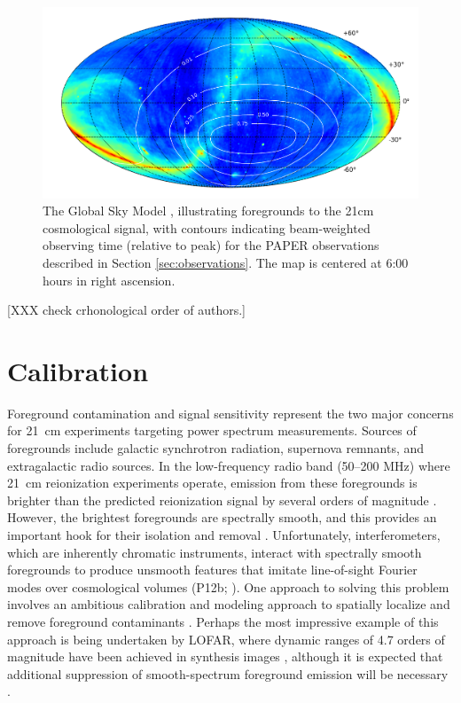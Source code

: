 \documentclass[twocolumn,numberedappendix]{emulateapj} \shorttitle{New Limits on the 21 cm Power Spectrum at $z=8.4$}
\begin{document}
\begin{figure}\centering
\includegraphics[width=2\columnwidth]{plots/coverage.png}
\caption{The Global Sky Model \citep{deoliveira2008}, illustrating foregrounds to the 21cm
cosmological signal, with 
contours indicating beam-weighted observing time (relative to peak) for the PAPER observations
described in Section \ref{sec:observations}.  The map is centered at 6:00 hours in right ascension.
}\label{fig:coverage}
\end{figure}


[XXX check crhonological order of authors.]
\section{Calibration}\label{sec:calib}

Foreground contamination and signal sensitivity represent the two major concerns for 21~cm
experiments targeting power spectrum measurements. Sources of foregrounds include
galactic synchrotron radiation, supernova remnants, and extragalactic radio sources.
In the low-frequency radio band (50--200 MHz) where 21~cm reionization
experiments operate, emission from these foregrounds is brighter than the
predicted reionization signal by several orders of magnitude
\citep{ghosh_et_al2011,bernardi_et_al2010,bernardi_et_al2009,ali_et_al2008,deoliveira2008,jelic_et_al2008,santos_et_al2005}.
However, the brightest foregrounds are spectrally smooth, and this provides an
important hook for their isolation and removal
\citep{liu_tegmark2012,petrovic_oh2011,liu_et_al2009}.  Unfortunately,
interferometers, which are inherently chromatic
instruments, interact with spectrally smooth foregrounds to produce unsmooth features that
imitate line-of-sight Fourier modes over cosmological volumes (P12b; \citealt{bowman_et_al2009,morales_et_al2006a}).
One approach to solving this problem involves an ambitious calibration and modeling approach to spatially localize and
remove foreground contaminants \citep{chapman_et_al2013,sullivan_et_al2012,harker_et_al2009,liu_et_al2008,bowman_et_al2008}.
Perhaps the most impressive example of this approach is being undertaken by LOFAR, where dynamic ranges of 4.7 
orders of magnitude have
been achieved in synthesis images \citep{yatawatta_et_al2013}, although it is expected that additional
suppression of smooth-spectrum foreground emission will be necessary \citep{chapman_et_al2013}.
\end{document}
